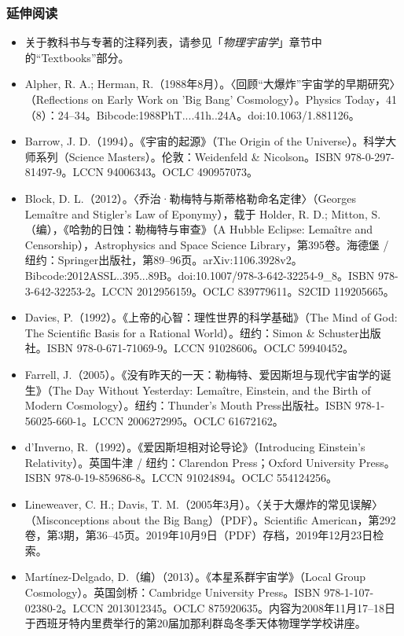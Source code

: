 \subsubsection{延伸阅读}
\begin{itemize}
\item 关于教科书与专著的注释列表，请参见「\textit{物理宇宙学}」章节中的“Textbooks”部分。  
\item Alpher, R. A.; Herman, R.（1988年8月）。〈回顾“大爆炸”宇宙学的早期研究〉（Reflections on Early Work on 'Big Bang' Cosmology）。Physics Today，41（8）：24–34。Bibcode:1988PhT....41h..24A。doi:10.1063/1.881126。  
\item Barrow, J. D.（1994）。《宇宙的起源》（The Origin of the Universe）。科学大师系列（Science Masters）。伦敦：Weidenfeld & Nicolson。ISBN 978-0-297-81497-9。LCCN 94006343。OCLC 490957073。  
\item Block, D. L.（2012）。〈乔治·勒梅特与斯蒂格勒命名定律〉（Georges Lemaître and Stigler's Law of Eponymy），载于 Holder, R. D.; Mitton, S.（编），《哈勃的日蚀：勒梅特与审查》（A Hubble Eclipse: Lemaître and Censorship），Astrophysics and Space Science Library，第395卷。海德堡 / 纽约：Springer出版社，第89–96页。arXiv:1106.3928v2。Bibcode:2012ASSL..395...89B。doi:10.1007/978-3-642-32254-9_8。ISBN 978-3-642-32253-2。LCCN 2012956159。OCLC 839779611。S2CID 119205665。  
\item Davies, P.（1992）。《上帝的心智：理性世界的科学基础》（The Mind of God: The Scientific Basis for a Rational World）。纽约：Simon & Schuster出版社。ISBN 978-0-671-71069-9。LCCN 91028606。OCLC 59940452。  
\item Farrell, J.（2005）。《没有昨天的一天：勒梅特、爱因斯坦与现代宇宙学的诞生》（The Day Without Yesterday: Lemaître, Einstein, and the Birth of Modern Cosmology）。纽约：Thunder’s Mouth Press出版社。ISBN 978-1-56025-660-1。LCCN 2006272995。OCLC 61672162。  
\item d’Inverno, R.（1992）。《爱因斯坦相对论导论》（Introducing Einstein’s Relativity）。英国牛津 / 纽约：Clarendon Press；Oxford University Press。ISBN 978-0-19-859686-8。LCCN 91024894。OCLC 554124256。  
\item Lineweaver, C. H.; Davis, T. M.（2005年3月）。〈关于大爆炸的常见误解〉（Misconceptions about the Big Bang）（PDF）。Scientific American，第292卷，第3期，第36–45页。2019年10月9日（PDF）存档，2019年12月23日检索。  
\item Martínez-Delgado, D.（编）（2013）。《本星系群宇宙学》（Local Group Cosmology）。英国剑桥：Cambridge University Press。ISBN 978-1-107-02380-2。LCCN 2013012345。OCLC 875920635。内容为2008年11月17–18日于西班牙特内里费举行的第20届加那利群岛冬季天体物理学学校讲座。  

\end{itemize}
